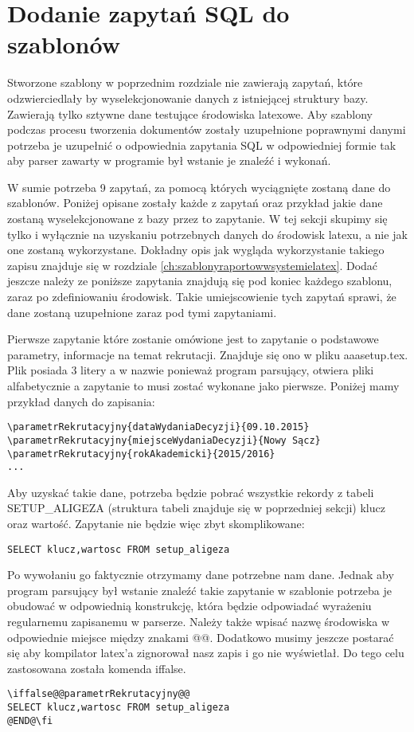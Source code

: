 \section{Dodanie zapytań SQL do szablonów}

Stworzone szablony w poprzednim rozdziale nie zawierają zapytań, które odzwierciedlały by wyselekcjonowanie danych z istniejącej struktury bazy. Zawierają tylko sztywne dane testujące środowiska latexowe. Aby szablony podczas procesu tworzenia dokumentów zostały uzupełnione poprawnymi danymi potrzeba je uzupełnić o odpowiednia zapytania SQL w odpowiedniej formie tak aby parser zawarty w programie był wstanie je znaleźć i wykonań.
\par 
W sumie potrzeba 9 zapytań, za pomocą których wyciągnięte zostaną dane do szablonów. Poniżej opisane zostały każde z zapytań oraz przykład jakie dane zostaną wyselekcjonowane z bazy przez to zapytanie. W tej sekcji skupimy się tylko i wyłącznie na uzyskaniu potrzebnych danych do środowisk latexu, a nie jak one zostaną wykorzystane. Dokładny opis jak wygląda wykorzystanie takiego zapisu znajduje się w rozdziale \ref{ch:szablonyraportowwsystemielatex}. Dodać jeszcze należy ze poniższe zapytania znajdują się pod koniec każdego szablonu, zaraz po zdefiniowaniu środowisk. Takie umiejscowienie tych zapytań sprawi, że dane zostaną uzupełnione zaraz pod tymi zapytaniami.
\par 
Pierwsze zapytanie które zostanie omówione jest to  zapytanie o podstawowe parametry, informacje na temat rekrutacji. Znajduje się ono w pliku aaasetup.tex. Plik posiada 3 litery a w nazwie ponieważ program parsujący, otwiera pliki alfabetycznie a zapytanie to musi zostać wykonane jako pierwsze.  Poniżej mamy przykład danych do zapisania:
 \begin{verbatim}
\parametrRekrutacyjny{dataWydaniaDecyzji}{09.10.2015}
\parametrRekrutacyjny{miejsceWydaniaDecyzji}{Nowy Sącz}
\parametrRekrutacyjny{rokAkademicki}{2015/2016}
...
\end{verbatim}
Aby uzyskać takie dane, potrzeba będzie pobrać wszystkie rekordy z tabeli SETUP\_ALIGEZA (struktura tabeli znajduje się w poprzedniej sekcji) klucz oraz wartość. Zapytanie nie będzie więc zbyt skomplikowane:
 \begin{verbatim}
SELECT klucz,wartosc FROM setup_aligeza
\end{verbatim}
Po wywołaniu go faktycznie otrzymamy dane potrzebne nam dane. Jednak aby program parsujący był wstanie znaleźć takie zapytanie w szablonie potrzeba je obudować w odpowiednią konstrukcję, która będzie odpowiadać wyrażeniu regularnemu zapisanemu w parserze. Należy także wpisać nazwę środowiska w odpowiednie miejsce między znakami @@. Dodatkowo musimy jeszcze postarać się aby kompilator latex'a zignorował nasz zapis i go nie wyświetlał. Do tego celu zastosowana została komenda iffalse.
 \begin{verbatim}
\iffalse@@parametrRekrutacyjny@@
SELECT klucz,wartosc FROM setup_aligeza
@END@\fi
\end{verbatim}

